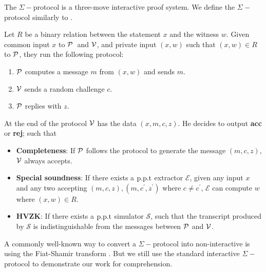 The $\Sigma-$protocol is a three-move interactive proof system. We define the $\Sigma-$protocol similarly to \cite{damgard10}.
\begin{definition} 
\label{sec:sigma}
Let $R$ be a binary relation between the statement $x$ and the witness $w$. Given common input $x$ to $\mathcal{P}$\ and $\mathcal{V}$, and private input $(x,w)$ such that $(x,w)\in{R}$ to $\mathcal{P}$, they run the following protocol:
\begin{enumerate}
    \item $\mathcal{P}$ computes a message $m$ from $(x,w)$ and sends $m$.
    \item $\mathcal{V}$ sends a random challenge $c$.
    \item $\mathcal{P}$ replies with $z$.
\end{enumerate}
At the end of the protocol $\mathcal{V}$ has the data $(x,m,c,z)$. He decides to output \textbf{acc} or \textbf{rej}; such that
\begin{itemize}
    \item \textbf{Completeness}: If $\mathcal{P}$ follows the protocol to generate the message $(m,c,z)$, $\mathcal{V}$ always accepts.
    \item \textbf{Special soundness}: If there exists a $\text{p.p.t}$ extractor $\mathcal{E}$, given any input $x$ and any two accepting $(m,c,z),(m,c^\prime,z^\prime)$ where $c\ne{c^\prime}$, $\mathcal{E}$ can compute $w$ where $(x,w)\in{R}$.
    \item \textbf{HVZK}: If there exists a $\text{p.p.t}$ simulator $\mathcal{S}$, such that the transcript produced by $\mathcal{S}$ is indistinguishable from the messages between $\mathcal{P}$ and $\mathcal{V}$.
\end{itemize}
\end{definition}
A commonly well-known way to convert a $\Sigma-$protocol into non-interactive is using the Fiat-Shamir transform \cite{fs}. But we still use the standard interactive $\Sigma-$protocol to demonstrate our work for comprehension.

